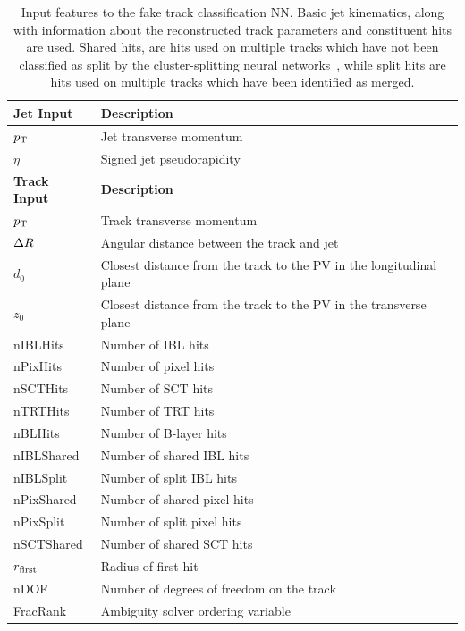 \begin{table}[!htbp]
  \footnotesize\centering
  \setlength{\tabcolsep}{0.5em} %
  \begin{tabular}{ll}
    \toprule\hline
    \textbf{Jet Input} & \textbf{Description} \\
    \hline
    $p_{\text{T}}$ & Jet transverse momentum \\
    $\eta$ & Signed jet pseudorapidity \\
    \toprule
    \textbf{Track Input} & \textbf{Description} \\
    \hline
    $p_{\text{T}}$ & Track transverse momentum \\
    $\Delta R$ & Angular distance between the track and jet \\
    $d_0$  & Closest distance from the track to the PV in the longitudinal plane \\
    $z_0$  & Closest distance from the track to the PV in the transverse plane \\
    nIBLHits   & Number of IBL hits \\
    nPixHits   & Number of pixel hits \\
    nSCTHits   & Number of SCT hits \\
    nTRTHits   & Number of TRT hits \\
    nBLHits    & Number of B-layer hits \\
    nIBLShared & Number of shared IBL hits \\
    nIBLSplit  & Number of split IBL hits \\
    nPixShared & Number of shared pixel hits \\
    nPixSplit  & Number of split pixel hits \\
    nSCTShared & Number of shared SCT hits \\
    $r_{\textnormal{first}}$      & Radius of first hit \\
    nDOF   & Number of degrees of freedom on the track \\
    FracRank & Ambiguity solver ordering variable \\
    \hline\bottomrule
  \end{tabular}
  \caption{
    Input features to the fake track classification NN.
    Basic jet kinematics, along with information about the reconstructed track parameters and constituent hits are used.
    Shared hits, are hits used on multiple tracks which have not been classified as split by the cluster-splitting neural networks~\cite{PERF-2015-08}, while split hits are hits used on multiple tracks which have been identified as merged.
  }
  \label{tab:fake_mva_track_inputs}
\end{table}

